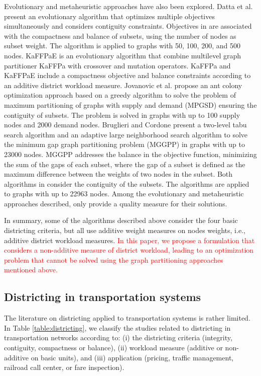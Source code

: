 \documentclass[preprint,11pt]{elsarticle}
\begin{document}
Evolutionary and metaheuristic approaches have also been explored.
Datta et al. \citep{Datta2008} present an evolutionary algorithm that optimizes multiple objectives simultaneously and considers contiguity constraints.
Objectives in \citep{Datta2008} are associated with the compactness and balance of subsets, using the number of nodes as subset weight.  
The algorithm is applied to graphs with 50, 100, 200, and 500 nodes.
KaFFPaE \citep{Sanders2012} is an evolutionary algorithm that combine multilevel graph partitioner KaFFPa \citep{Sanders2011} with crossover and mutation operators.
KaFFPa and KaFFPaE include a compactness objective and balance constraints according to an additive district workload measure.
Jovanovic et al. \citep{Jovanovic2016} propose an ant colony optimization approach based on a greedy algorithm to solve the problem of maximum partitioning of graphs with supply and demand (MPGSD) ensuring the contiguity of subsets. 
The problem is solved in graphs with up to 100 supply nodes and 2000 demand nodes.
Bruglieri and Cordone \citep{Bruglieri2021} present a two-level tabu search algorithm and an adaptive large neighborhood search algorithm to solve the minimum gap graph partitioning problem (MGGPP) in graphs with up to 23000 nodes. 
MGGPP addresses the balance in the objective function, minimizing the sum of the gaps of each subset, where the gap of a subset is defined as the maximum difference between the weights of two nodes in the subset. 
Both algorithms in \citep{Bruglieri2021} consider the contiguity of the subsets. 
The algorithms are applied to graphs with up to 22963 nodes.
Among the evolutionary and metaheuristic approaches described, only \citep{Bruglieri2021} provide a quality measure for their solutions.

In summary, some of the algorithms described above consider the four basic districting criteria, but all use additive weight measures on nodes weights, i.e., additive district workload measures.
\textcolor{red}{In this paper, we propose a formulation that considers a non-additive measure of district workload, leading to an optimization problem that cannot be solved using the graph partitioning approaches mentioned above.}

\subsection{Districting in transportation systems} \label{sec:2.2}
The literature on districting applied to transportation systems is rather limited. In Table \ref{table:districting}, we classify the studies related to districting in transportation networks according to: (i) the districting criteria (integrity, contiguity, compactness or balance), (ii) workload measure (additive or non-additive on basic units), and (iii) application (pricing, traffic management, railroad call center, or fare inspection).
\end{document}
